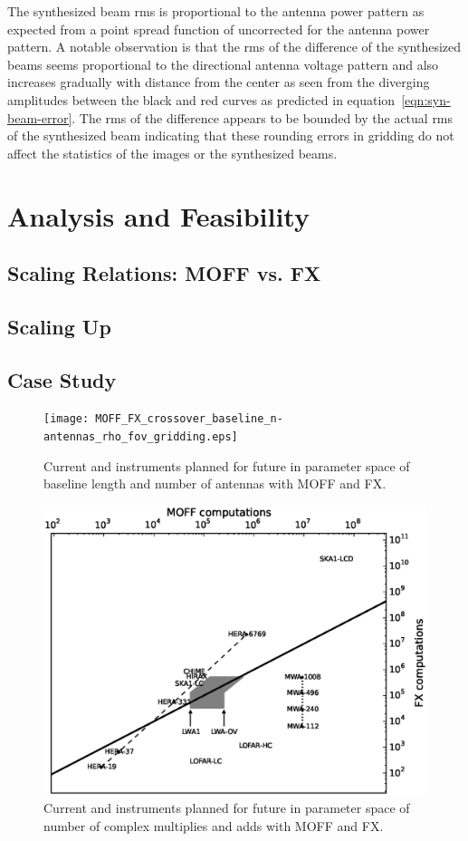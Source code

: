 \documentclass[a4paper,fleqn,usenatbib]{../mnras}
\begin{document}
The synthesized beam rms is proportional to the antenna power pattern as 
expected from a point spread function of uncorrected for the antenna power 
pattern. A notable observation is that the rms of the difference of
the synthesized beams seems proportional to the directional antenna voltage
pattern and also increases gradually with distance from the center as seen 
from the diverging amplitudes between the black and red curves as predicted
in equation~\ref{eqn:syn-beam-error}. The rms of the difference appears to 
be bounded by the actual rms of the synthesized beam indicating that these
rounding errors in gridding do not affect the statistics of the images or
the synthesized beams.

\section{Analysis and Feasibility}\label{sec:analysis}

\subsection{Scaling Relations: MOFF vs. FX}
\subsection{Scaling Up}
\subsection{Case Study}


\begin{figure}
  \texttt{[image: MOFF\_FX\_crossover\_baseline\_n-antennas\_rho\_fov\_gridding.eps]}
  \caption{Current and instruments planned for future in parameter space of
    baseline length and number of antennas with MOFF and FX.}
  \label{fig:parameter-space-bll-nant-instruments}
\end{figure}

\begin{figure}
  \includegraphics[width=\columnwidth]{MOFF_FX_computations_fov_gridding_annotated.eps}
  \caption{Current and instruments planned for future in parameter space of
    number of complex multiplies and adds with MOFF and FX.}
  \label{fig:parameter-space-computations-instruments}
\end{figure}
\end{document}
